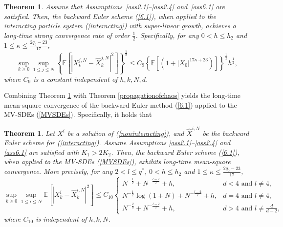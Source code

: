 \documentclass[12pt]{article}
\numberwithin{equation}{section}
\newtheorem{theorem}[assumption]{Theorem}   %
\begin{document}
\begin{theorem}\label{theorem6.8}
Assume that Assumptions~\ref{ass2.1}--\ref{ass2.4} and~\ref{ass6.1} are satisfied. Then, the backward Euler scheme  (\ref{6.1}), when applied to the interacting particle system (\ref{interacting}) with super-linear growth, achieves a long-time strong convergence rate of order $\frac{1}{2}$. Specifically,  for any $0<h \leq h_2$ and $1 \leq \kappa \leq \tfrac{2q_0-23}{17}$,  
\begin{equation}\tag{3.31}\label{6.42}
\underset{k\geqslant0}{\sup}\underset{1\leqslant j\leqslant N}{\sup}\left\{\mathbb{E} \left[ \left|X^{j,N}_k-\hat{X}^{j,N}_k\right|^2 \right]\right\}^{\frac{1}{2}}\le C_{9}\left\{\mathbb{E} \left[ \left( 1+\left| X_0 \right|^{17\kappa+23} \right) \right]\right\}^{\frac{1}{2}} h^{\frac{1}{2}},
\end{equation}
where $C_{9}$ is a constant independent of $h, k,N,d$.
\end{theorem}

Combining Theorem \ref{theorem6.8} with Theorem \ref{propagationofchaos} yields the long-time mean-square convergence of the backward Euler method (\ref{6.1}) applied to the MV-SDEs (\ref{MVSDEs}). Specifically, it holds that
\begin{theorem}\label{theorem6.9}
Let $X^{i}$ be a solution of  (\ref{noninteracting}), and $\hat{X}^{i,N}$ be the backward Euler scheme  for (\ref{interacting}). Assume Assumptions \ref{ass2.1}--\ref{ass2.4} and \ref{ass6.1} are satisfied with $K_1>2 K_2$. Then, the backward Euler scheme (\ref{6.1}), when applied to the MV-SDEs (\ref{MVSDEs}), exhibits long-time mean-square convergence. More precisely,  for any $2<l\leq q^*$, $0<h \leq h_2$ and $1 \leq \kappa \leq \tfrac{2q_0-23}{17}$, 
\begin{equation}\tag{3.32}\label{6.43}
\underset{k\geqslant0}{\sup}\underset{1\leqslant i\leqslant N}{\sup}\mathbb{E}\left[\left|X_k^i-\hat{X}_k^{i, N}\right|^2\right]
\leq C_{10} \begin{cases}N^{-\frac{1}{2}}+N^{-\frac{{l}-2}{l}}+h, & d<4 \text { and } {l} \neq 4, \\ N^{-\frac{1}{2}} \log \left(1+N\right)+N^{-\frac{{l}-2}{{l}}}+h, & d=4 \text { and } {l} \neq 4, \\ N^{-\frac{2}{d}}+N^{-\frac{{l}-2}{l}}+h, & d>4 \text { and } {l} \neq \frac{d}{d-2} ,\end{cases}
\end{equation}
where $C_{10}$ is independent of $h,k,N$.
\end{theorem}
\end{document}
